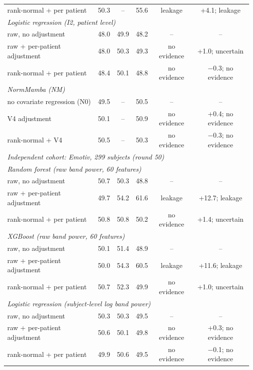 \begin{table}[t]
\begin{tabular}{p{}ccccc}
\quad rank-normal + per patient & 50.3 & -- & 55.6 & leakage & +4.1; leakage \\
\multicolumn{6}{l}{\textit{Logistic regression (I2, patient level)}} \\
\quad raw, no adjustment & 48.0 & 49.9 & 48.2 & -- & -- \\
\quad raw + per-patient adjustment & 48.0 & 50.3 & 49.3 & no evidence & +1.0; uncertain \\
\quad rank-normal + per patient & 48.4 & 50.1 & 48.8 & no evidence & $-$0.3; no evidence \\
\multicolumn{6}{l}{\textit{NormMamba (NM)}} \\
\quad no covariate regression (N0) & 49.5 & -- & 50.5 & -- & -- \\
\quad V4 adjustment & 50.1 & -- & 50.9 & no evidence & +0.4; no evidence \\
\quad rank-normal + V4 & 50.5 & -- & 50.3 & no evidence & $-$0.3; no evidence \\
\multicolumn{6}{l}{\textit{Independent cohort: Emotiv, 299 subjects (round 50)}} \\
\multicolumn{6}{l}{\quad\textit{Random forest (raw band power, 60 features)}} \\
\qquad raw, no adjustment & 50.7 & 50.3 & 48.8 & -- & -- \\
\qquad raw + per-patient adjustment & 49.7 & 54.2 & 61.6 & leakage & +12.7; leakage \\
\qquad rank-normal + per patient & 50.8 & 50.8 & 50.2 & no evidence & +1.4; uncertain \\
\multicolumn{6}{l}{\quad\textit{XGBoost (raw band power, 60 features)}} \\
\qquad raw, no adjustment & 50.1 & 51.4 & 48.9 & -- & -- \\
\qquad raw + per-patient adjustment & 50.0 & 54.3 & 60.5 & leakage & +11.6; leakage \\
\qquad rank-normal + per patient & 50.7 & 52.3 & 49.9 & no evidence & +1.0; uncertain \\
\multicolumn{6}{l}{\quad\textit{Logistic regression (subject-level log band power)}} \\
\qquad raw, no adjustment & 50.3 & 50.3 & 49.5 & -- & -- \\
\qquad raw + per-patient adjustment & 50.6 & 50.1 & 49.8 & no evidence & +0.3; no evidence \\
\qquad rank-normal + per patient & 49.9 & 50.6 & 49.5 & no evidence & $-$0.1; no evidence \\
\bottomrule
\end{tabular}
\end{table}
